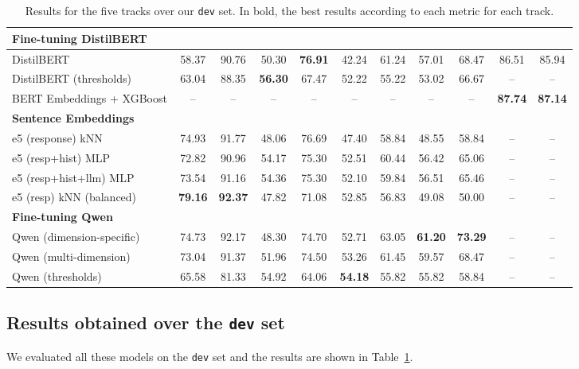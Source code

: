\documentclass[11pt]{article}
\begin{document}
\begin{table}[ht!]
{\begin{tabular}{lcccccccccc}
\hline
\multicolumn{9}{l}{\textbf{Fine-tuning DistilBERT}} \\
\hline
DistilBERT & 58.37 & 90.76 & 50.30 & \textbf{76.91} & 42.24 & 61.24 & 57.01 & 68.47 & 86.51 & 85.94\\
DistilBERT  (thresholds) & 63.04 & 88.35 & \textbf{56.30} & 67.47 & 52.22 & 55.22 & 53.02 & 66.67 & -- & -- \\
BERT Embeddings + XGBoost & -- & -- & -- & -- & -- & -- & -- & -- & \textbf{87.74} & \textbf{87.14} \\ 
\hline
\multicolumn{9}{l}{\textbf{Sentence Embeddings}} \\
\hline

e5 (response) kNN & 74.93 & 91.77 & 48.06 & 76.69 & 47.40 & 58.84 & 48.55 & 58.84 & -- & -- \\
e5 (resp+hist) MLP & 72.82 & 90.96 & 54.17 & 75.30 & 52.51 & 60.44 & 56.42 & 65.06 & -- & -- \\
e5 (resp+hist+llm) MLP  & 73.54 & 91.16 & 54.36 & 75.30 & 52.10 & 59.84 & 56.51 & 65.46 & -- & -- \\
e5 (resp) kNN (balanced) & \textbf{79.16} & \textbf{92.37} & 47.82 & 71.08 & 52.85 & 56.83 & 49.08 & 50.00 & -- & -- \\
\hline
\multicolumn{9}{l}{\textbf{Fine-tuning Qwen}} \\
\hline
Qwen (dimension-specific) & 74.73 & 92.17 & 48.30 & 74.70 & 52.71 & 63.05 & \textbf{61.20} & \textbf{73.29} & -- & -- \\
Qwen (multi-dimension) & 73.04 & 91.37 & 51.96 & 74.50 & 53.26 & 61.45 & 59.57 & 68.47 & -- & -- \\
Qwen (thresholds) & 65.58 & 81.33 & 54.92 & 64.06 & \textbf{54.18} & 55.82 & 55.82 & 58.84 & -- & -- \\
\hline
\end{tabular}
}
\caption{Results for the five tracks over our \texttt{dev} set. In bold, the best results according to each metric for each track.}
\label{tab:dev_results}
\end{table}

\subsection{Results obtained over the \texttt{dev} set}
\label{sec:results_dev}

We evaluated all these models on the \texttt{dev} set and the results are shown in Table~\ref{tab:dev_results}.
\end{document}
